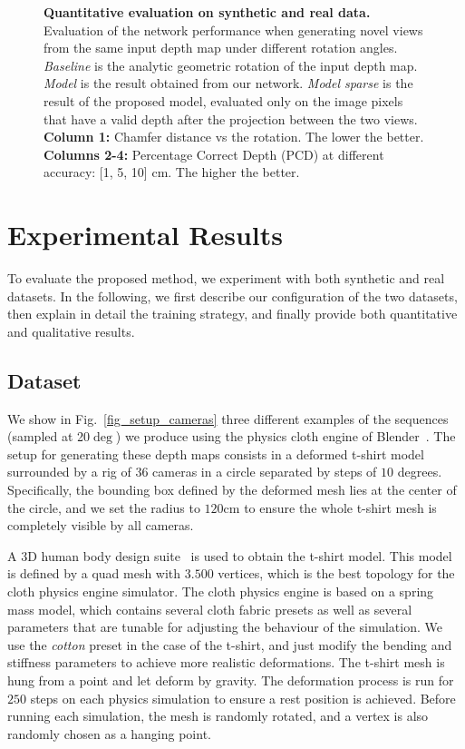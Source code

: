 \begin{figure}
\begin{tabular}{ccccc}
    \end{tabular}
    \caption{\small{{\bf Quantitative evaluation on synthetic and real data.} Evaluation of the network performance when generating novel views from the same input depth map under different rotation angles. {\em Baseline} is the analytic geometric rotation of the input depth map. {\em Model} is the result obtained from our network. {\em Model sparse} is the result of the proposed model, evaluated only on the image pixels that have a valid depth after the projection between the two views. \textbf{Column 1:} Chamfer distance vs the rotation. The lower the better. \textbf{Columns 2-4:} Percentage Correct Depth (PCD) at different accuracy: [1, 5, 10] cm. The higher the better.}}
    \label{fig_plot_synth_rotations}
\end{figure}

\section{Experimental Results}
To evaluate the proposed method, we experiment with both synthetic and real datasets. In the following, we first describe our configuration of the two datasets, then explain in detail the training strategy, and finally provide both quantitative and qualitative results.

\subsection{Dataset}

\vspace{1mm}
 We show in Fig.~\ref{fig_setup_cameras} three different examples of the sequences (sampled at 20$\deg$) we produce using the physics cloth engine of Blender~\cite{Blender}. The setup for generating these depth maps consists in a deformed t-shirt model surrounded by a rig of $36$ cameras in a circle separated by steps of $10$ degrees. Specifically, the bounding box defined by the deformed mesh lies at the center of the circle, and we set the radius to $120$cm to ensure the whole t-shirt mesh is completely visible by all cameras.

A 3D human body design suite~\cite{Makehuman} is used to obtain the t-shirt model. This model is defined by a quad mesh with $3.500$ vertices, which is the best topology for the cloth physics engine simulator. The cloth physics engine is based on a spring mass model, which contains several cloth fabric presets as well as several parameters that are tunable for adjusting the behaviour of the simulation. We use the \textit{cotton} preset in the case of the t-shirt, and just modify the bending and stiffness parameters to achieve more realistic deformations. The t-shirt mesh is hung from  a point and let deform by gravity. The deformation process is run for $250$ steps on each physics simulation to ensure a rest position is achieved. Before running each simulation, the mesh is randomly rotated, and a vertex is also randomly chosen as a hanging point. 

